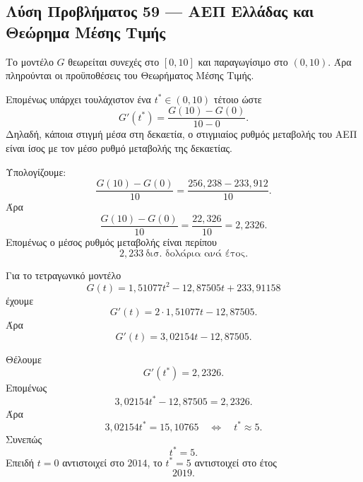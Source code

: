 \subsection*{Λύση Προβλήματος 59 --- ΑΕΠ Ελλάδας και Θεώρημα Μέσης Τιμής}

\begin{alist}
  \item Το μοντέλο \(G\) θεωρείται συνεχές στο \([0,10]\) και
        παραγωγίσιμο στο \((0,10)\). Άρα πληρούνται οι προϋποθέσεις του
        Θεωρήματος Μέσης Τιμής.

        Επομένως υπάρχει τουλάχιστον ένα \(t^*\in(0,10)\) τέτοιο ώστε
        \[
          G'(t^*)
          =
          \frac{G(10)-G(0)}{10-0}.
        \]
        Δηλαδή, κάποια στιγμή μέσα στη δεκαετία, ο στιγμιαίος ρυθμός
        μεταβολής του ΑΕΠ είναι ίσος με τον μέσο ρυθμό μεταβολής της
        δεκαετίας.

  \item Υπολογίζουμε:
        \[
          \frac{G(10)-G(0)}{10}
          =
          \frac{256{,}238-233{,}912}{10}.
        \]
        Άρα
        \[
          \frac{G(10)-G(0)}{10}
          =
          \frac{22{,}326}{10}
          =
          2{,}2326.
        \]
        Επομένως ο μέσος ρυθμός μεταβολής είναι περίπου
        \[
          {
          2{,}233\ \text{δισ. δολάρια ανά έτος}
          }.
        \]

  \item Για το τετραγωνικό μοντέλο
        \[
          G(t)=1{,}51077t^2-12{,}87505t+233{,}91158
        \]
        έχουμε
        \[
          G'(t)=2\cdot1{,}51077t-12{,}87505.
        \]
        Άρα
        \[
          G'(t)=3{,}02154t-12{,}87505.
        \]

        Θέλουμε
        \[
          G'(t^*)=2{,}2326.
        \]
        Επομένως
        \[
          3{,}02154t^*-12{,}87505=2{,}2326.
        \]
        Άρα
        \[
          3{,}02154t^*=15{,}10765
          \quad\Longleftrightarrow\quad
          t^*\approx5.
        \]
        Συνεπώς
        \[
          {t^*=5}.
        \]
        Επειδή \(t=0\) αντιστοιχεί στο \(2014\), το \(t^*=5\)
        αντιστοιχεί στο έτος
        \[
          {2019}.
        \]
\end{alist}
